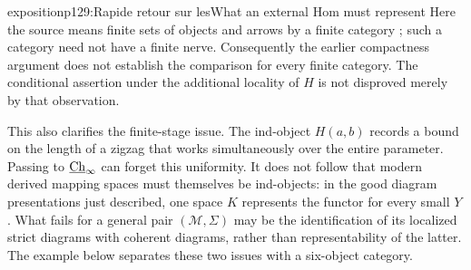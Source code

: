 \begin{dcomment}{exposition}{p129:Rapide retour sur les}{What an external Hom must represent}
Here the source means finite sets of objects and arrows by a finite category \citep[ms.~45]{Grothendieck1990V}; such a category need not have a finite nerve. Consequently the earlier compactness argument does not establish the comparison for every finite category. The conditional assertion under the additional locality of $H$ is not disproved merely by that observation.

This also clarifies the finite-stage issue. The ind-object $H(a,b)$ records a bound on the length of a zigzag that works simultaneously over the entire parameter. Passing to $\underline{\mathrm{Ch}}_\infty$ can forget this uniformity. It does not follow that modern derived mapping spaces must themselves be ind-objects: in the good diagram presentations just described, one space $K$ represents the functor for every small $Y$. What fails for a general pair $(\mathcal M,\Sigma)$ may be the identification of its localized strict diagrams with coherent diagrams, rather than representability of the latter. The example below separates these two issues with a six-object category.
\end{dcomment}


